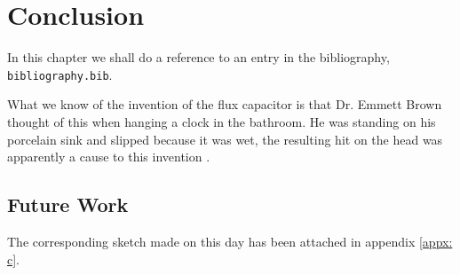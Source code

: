\section{Conclusion}
\label{sec: Reference}

\noindent In this chapter we shall do a reference to an entry in the bibliography, \texttt{bibliography.bib}. 

What we know of the invention of the flux capacitor is that Dr. Emmett Brown thought of this when hanging a clock in the bathroom. He was standing on his porcelain sink and slipped because it was wet, the resulting hit on the head was apparently a cause to this invention \cite{olmeda2021towards}. 

\subsection{Future Work}
The corresponding sketch made on this day has been attached in appendix \ref{appx: c}.

